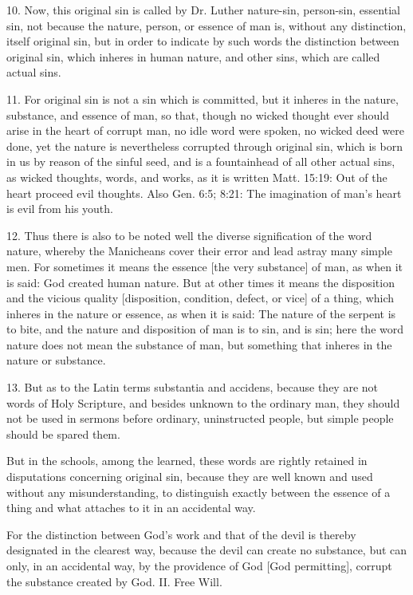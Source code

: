  10. Now, this original sin is called by Dr. Luther nature-sin, person-sin, essential sin, not because the nature, person, or essence of man is, without any distinction, itself original sin, but in order to indicate by such words the distinction between original sin, which inheres in human nature, and other sins, which are called actual sins.

 11. For original sin is not a sin which is committed, but it inheres in the nature, substance, and essence of man, so that, though no wicked thought ever should arise in the heart of corrupt man, no idle word were spoken, no wicked deed were done, yet the nature is nevertheless corrupted through original sin, which is born in us by reason of the sinful seed, and is a fountainhead of all other actual sins, as wicked thoughts, words, and works, as it is written Matt. 15:19: Out of the heart proceed evil thoughts. Also Gen. 6:5; 8:21: The imagination of man's heart is evil from his youth.

 12. Thus there is also to be noted well the diverse signification of the word nature, whereby the Manicheans cover their error and lead astray many simple men. For sometimes it means the essence [the very substance] of man, as when it is said: God created human nature. But at other times it means the disposition and the vicious quality [disposition, condition, defect, or vice] of a thing, which inheres in the nature or essence, as when it is said: The nature of the serpent is to bite, and the nature and disposition of man is to sin, and is sin; here the word nature does not mean the substance of man, but something that inheres in the nature or substance.

 13. But as to the Latin terms substantia and accidens, because they are not words of Holy Scripture, and besides unknown to the ordinary man, they should not be used in sermons before ordinary, uninstructed people, but simple people should be spared them.

 But in the schools, among the learned, these words are rightly retained in disputations concerning original sin, because they are well known and used without any misunderstanding, to distinguish exactly between the essence of a thing and what attaches to it in an accidental way.

 For the distinction between God's work and that of the devil is thereby designated in the clearest way, because the devil can create no substance, but can only, in an accidental way, by the providence of God [God permitting], corrupt the substance created by God.
II. Free Will.

